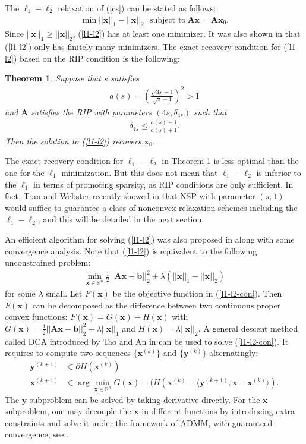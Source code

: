 \documentclass[11pt]{article}
\numberwithin{equation}{section}
\theoremstyle{plain}
\newtheorem{Th}{Theorem}[section]
\theoremstyle{definition}
\def\R{{\mathbb R}}
\def\R{{\mathbb R}}
\def\A{{\mathbf A}}
\def\x{{\mathbf x}}
\def\b{{\mathbf b}}
\def\y{{\mathbf{y}}}
\begin{document}
The $\ell_1-\ell_2$ relaxation of (\ref{cs}) can be stated as follows:
\begin{align}
\min ||\x||_1-||\x||_2 \ \ \ \text{subject to}\ \A\x=\A\x_0.\label{l1-l2}
\end{align} 
Since $||\x||_1\geq ||\x||_2$, (\ref{l1-l2}) has at least one minimizer. It was also shown in \cite{yin2015minimization} that (\ref{l1-l2}) only has finitely many minimizers. The exact recovery condition for (\ref{l1-l2}) based on the RIP condition is the following:
\begin{Th}\label{l1-l2 Th}
Suppose that $s$ satisfies 
\begin{align*}
a(s)=\left(\frac{\sqrt{3s}-1}{\sqrt{s}+1}\right)^2>1
\end{align*}
and $\A$ satisfies the RIP with parameters $(4s, \delta_{4s})$ such that 
\begin{align*}
\delta_{4s}\leq\frac{a(s)-1}{a(s)+1}.
\end{align*}
Then the solution to (\ref{l1-l2}) recovers $\x_0$. 
\end{Th}
The exact recovery condition for $\ell_1-\ell_2$ in Theorem \ref{l1-l2 Th} is less optimal than the one for the $\ell_1$ minimization. But this does not mean that $\ell_1-\ell_2$ is inferior to the $\ell_1$ in terms of promoting sparsity, as RIP conditions are only sufficient. In fact, Tran and Webster recently showed in \cite{tran2017unified} that NSP with parameter $(s, 1)$ would suffice to guarantee a class of nonconvex relaxation schemes including the $\ell_1-\ell_2$, and this will be detailed in the next section. 

An efficient algorithm for solving (\ref{l1-l2}) was also proposed in \cite{yin2015minimization} along with some convergence analysis. Note that (\ref{l1-l2}) is equivalent to the following unconstrained problem:
\begin{align}
\min_{\x\in\R^n}\frac{1}{2}||\A\x-\b||_2^2+\lambda(||\x||_1-||\x||_2)\label{l1-l2-con}
\end{align}
for some $\lambda$ small. Let $F(\x)$ be the objective function in (\ref{l1-l2-con}). Then $F(\x)$ can be decomposed as the difference between two continuous proper convex functions: $F(\x)=G(\x)-H(\x)$ with $G
(\x)=\frac{1}{2}||\A\x-\b||_2^2+\lambda ||\x||_1$ and $H(\x)=\lambda ||\x||_2$. A general descent method called DCA introduced by Tao and An in \cite{tao1998dc} can be used to solve (\ref{l1-l2-con}). It requires to compute two sequences $\{\x^{(k)}\}$ and $\{\y^{(k)}\}$ alternatingly:
\begin{align*}
\y^{(k+1)}&\in\partial H(\x^{(k)})\\
\x^{(k+1)}&\in\arg\min_{\x\in\R^n}G(\x)-(H(\x^{(k)}-\langle \y^{(k+1)}, \x-\x^{(k)}\rangle).
\end{align*}
The $\y$ subproblem can be solved by taking derivative directly. For the $\x$ subproblem, one may decouple the $\x$ in different functions by introducing extra constraints and solve it under the framework of ADMM, with guaranteed convergence, see \cite{boyd2011distributed}. 
\end{document}
